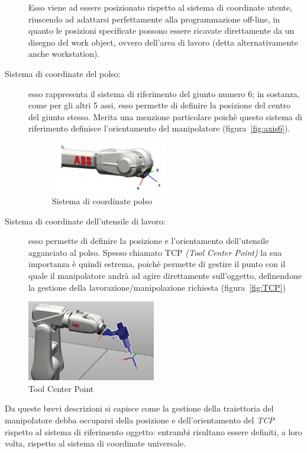 \begin{description}
	Esso viene ad essere posizionato rispetto al sistema di coordinate utente, riuscendo ad adattarsi perfettamente alla programmazione off-line, in quanto le posizioni specificate	possono essere ricavate direttamente da un disegno del work object, ovvero dell'area di lavoro (detta alternativamente anche workstation).
	\item[Sistema di coordinate del polso:]\label{item:SdR_Polso} esso rappresenta il sistema di riferimento del giunto numero 6; in sostanza, come per gli altri 5 assi, esso permette di definire la posizione del centro del giunto stesso. Merita una menzione particolare poichè questo sistema di riferimento definisce l'orientamento del manipolatore (figura~\vref{fig:axis6}).
	\begin{figure}[h]
		\centering
		\includegraphics[width=0.5\textwidth]{Immagini/SistemaDiRiferimento_Polso}
		\caption{Sistema di coordinate polso}
		\label{fig:axis6}
	\end{figure}
	\item[Sistema di coordinate dell'utensile di lavoro:]\label{item:TCP} esso permette di definire la posizione e l'orientamento dell'utensile agganciato al polso. Spesso chiamato TCP \emph{(Tool Center Point)} la sua importanza è quindi estrema, poichè permette di gestire il punto con il quale il manipolatore andrà ad agire direttamente sull'oggetto, definendone la gestione della lavorazione/manipolazione richiesta (figura~\vref{fig:TCP})
\end{description}
\begin{figure}[h]
	\centering
	\includegraphics[width=0.5\textwidth]{Immagini/TCP}
	\caption{Tool Center Point}
	\label{fig:TCP}
\end{figure}
Da queste brevi descrizioni si capisce come la gestione della traiettoria del manipolatore debba occuparsi della posizione e dell'orientamento del \emph{TCP} rispetto al sistema di riferimento oggetto: entrambi risultano essere definiti, a loro volta, rispetto al sistema di coordinate universale.



